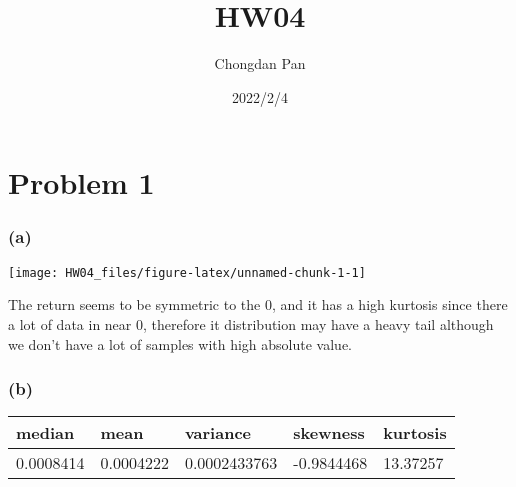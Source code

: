 \documentclass[
]{article}
\title{HW04}
\author{Chongdan Pan}
\date{2022/2/4}
\newenvironment{Shaded}{\begin{snugshade}}{\end{snugshade}}
\newcommand{\AttributeTok}[1]{\textcolor[rgb]{0.77,0.63,0.00}{#1}}
\newcommand{\ConstantTok}[1]{\textcolor[rgb]{0.00,0.00,0.00}{#1}}
\newcommand{\DecValTok}[1]{\textcolor[rgb]{0.00,0.00,0.81}{#1}}
\newcommand{\FunctionTok}[1]{\textcolor[rgb]{0.00,0.00,0.00}{#1}}
\newcommand{\NormalTok}[1]{#1}
\newcommand{\OtherTok}[1]{\textcolor[rgb]{0.56,0.35,0.01}{#1}}
\newcommand{\SpecialCharTok}[1]{\textcolor[rgb]{0.00,0.00,0.00}{#1}}
\newcommand{\StringTok}[1]{\textcolor[rgb]{0.31,0.60,0.02}{#1}}
\begin{document}
\maketitle

\hypertarget{problem-1}{%
\section{Problem 1}\label{problem-1}}

\hypertarget{a}{%
\subsubsection{(a)}\label{a}}

\begin{Shaded}
\end{Shaded}

\begin{center}\texttt{[image: HW04\_files/figure-latex/unnamed-chunk-1-1]} \end{center}

The return seems to be symmetric to the 0, and it has a high kurtosis
since there a lot of data in near 0, therefore it distribution may have
a heavy tail although we don't have a lot of samples with high absolute
value.

\hypertarget{b}{%
\subsubsection{(b)}\label{b}}

\begin{longtable}[]{@{}lllll@{}}
\toprule
median & mean & variance & skewness & kurtosis \\
\midrule
\endhead
0.0008414 & 0.0004222 & 0.0002433763 & -0.9844468 & 13.37257 \\
\bottomrule
\end{longtable}
\end{document}
